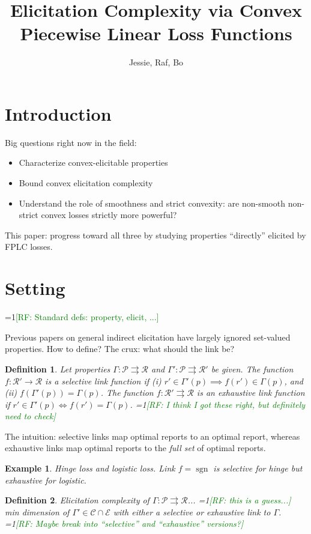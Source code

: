\documentclass[11pt]{article}
\title{Elicitation Complexity via Convex Piecewise Linear Loss Functions}
\author{Jessie, Raf, Bo}
\newcommand{\Comments}{1}
\newcommand{\mynote}[2]{\ifnum\Comments=1\textcolor{#1}{#2}\fi}
\newcommand{\raf}[1]{\mynote{green}{[RF: #1]}}
\renewcommand{\P}{\mathcal{P}}
\newcommand{\R}{\mathcal{R}}
\newcommand{\toto}{\rightrightarrows}
\DeclareMathOperator*{\sgn}{sgn}
\newtheorem{definition}{Definition}
\newtheorem{example}{Example}
\begin{document}
\maketitle

\section{Introduction}
Big questions right now in the field:
\begin{itemize}
\item Characterize convex-elicitable properties
\item Bound convex elicitation complexity
\item Understand the role of smoothness and strict convexity: are non-smooth non-strict convex losses strictly more powerful?
\end{itemize}

This paper: progress toward all three by studying properties ``directly'' elicited by FPLC losses.

\section{Setting}

\raf{Standard defs: property, elicit, ...}

Previous papers on general indirect elicitation have largely ignored set-valued properties.
How to define?
The crux: what should the link be?

\begin{definition}
  Let properties $\Gamma:\P\toto\R$ and $\Gamma':\P\toto\R'$ be given.
  The function $f:\R'\to\R$ is a \emph{selective link function} if (i) $r'\in\Gamma'(p) \implies f(r') \in \Gamma(p)$, and (ii) $f(\Gamma'(p)) = \Gamma(p)$.
  The function $f:\R'\toto\R$ is an \emph{exhaustive link function} if $r'\in\Gamma'(p) \iff f(r') = \Gamma(p)$.
  \raf{I think I got these right, but definitely need to check}
\end{definition}

The intuition: selective links map optimal reports to an optimal report, whereas exhaustive links map optimal reports to the \emph{full set} of optimal reports.

\begin{example}
  Hinge loss and logistic loss.
  Link $f = \sgn$ is selective for hinge but exhaustive for logistic.
\end{example}

\begin{definition}
  Elicitation complexity of $\Gamma:\P\toto\R$... \raf{this is a guess...} min dimension of $\Gamma'\in\mathcal{C}\cap\mathcal{E}$ with either a selective or exhaustive link to $\Gamma$.
  \raf{Maybe break into ``selective'' and ``exhaustive'' versions?}
\end{definition}
\end{document}

